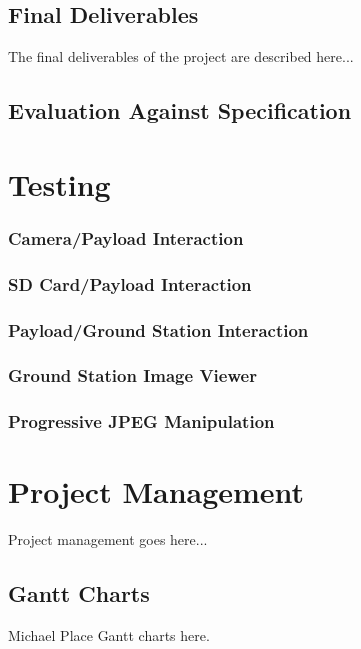 \documentclass[oneside]{ecsgdp}         %
\begin{document}
\section{Final Deliverables}
The final deliverables of the project are described here...

\section{Evaluation Against Specification}


\chapter{Testing}

\subsection{Camera/Payload Interaction}

\subsection{SD Card/Payload Interaction}

\subsection{Payload/Ground Station Interaction}

\subsection{Ground Station Image Viewer}

\subsection{Progressive JPEG Manipulation}

\chapter{Project Management}
Project management goes here...

\section{Gantt Charts}
Michael
Place Gantt charts here.
\end{document}
